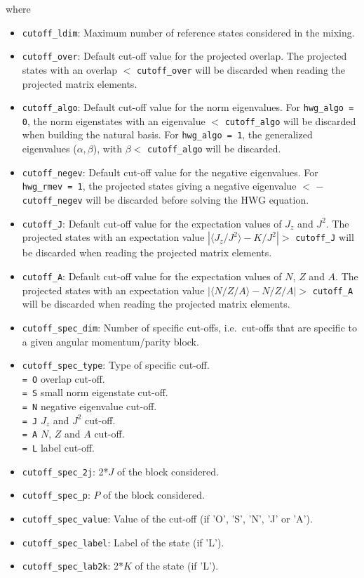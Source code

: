 \documentclass[a4paper,11pt]{article}
\newcommand{\ttt}[1]{\texttt{#1}}
\begin{document}
where
\begin{itemize}
\item \ttt{cutoff\_ldim}: Maximum number of reference states considered in the mixing.
\item \ttt{cutoff\_over}: Default cut-off value for the projected overlap. The projected states with an overlap $<$ \ttt{cutoff\_over} will be discarded when reading the projected matrix elements.
\item \ttt{cutoff\_algo}: Default cut-off value for the norm eigenvalues. For \ttt{hwg\_algo = 0}, the norm eigenstates with an eigenvalue $<$ \ttt{cutoff\_algo} will be discarded when 
      building the natural basis. For \ttt{hwg\_algo = 1}, the generalized eigenvalues ($\alpha,\beta$), with $\beta <$ \ttt{cutoff\_algo} will be discarded.
\item \ttt{cutoff\_negev}: Default cut-off value for the negative eigenvalues. For \ttt{hwg\_rmev = 1}, the projected states giving a negative eigenvalue $<$ $-$\ttt{cutoff\_negev} 
      will be discarded before solving the HWG equation.
\item \ttt{cutoff\_J}: Default cut-off value for the expectation values of $J_z$ and $J^2$. The projected states with an expectation value $|\langle J_z/J^2 \rangle - K/J^2| >$ \ttt{cutoff\_J}
      will be discarded when reading the projected matrix elements.
\item \ttt{cutoff\_A}: Default cut-off value for the expectation values of $N$, $Z$ and $A$. The projected states with an expectation value $|\langle N/Z/A \rangle - N/Z/A| >$ \ttt{cutoff\_A}
      will be discarded when reading the projected matrix elements.
\item \ttt{cutoff\_spec\_dim}: Number of specific cut-offs, i.e.\ cut-offs that are specific to a given angular momentum/parity block.
\item \ttt{cutoff\_spec\_type}: Type of specific cut-off. \\[0.05cm]
 \ttt{= O\:} overlap cut-off. \\[0.05cm]
 \ttt{= S\:} small norm eigenstate cut-off. \\[0.05cm]
 \ttt{= N\:} negative eigenvalue cut-off. \\[0.05cm]
 \ttt{= J\:} $J_z$ and $J^2$ cut-off. \\[0.05cm]
 \ttt{= A\:} $N$, $Z$ and $A$ cut-off. \\[0.05cm]
 \ttt{= L\:} label cut-off. 
\item \ttt{cutoff\_spec\_2j}: 2*$J$ of the block considered.
\item \ttt{cutoff\_spec\_p}: $P$ of the block considered.
\item \ttt{cutoff\_spec\_value}: Value of the cut-off (if 'O', 'S', 'N', 'J' or 'A').
\item \ttt{cutoff\_spec\_label}: Label of the state (if 'L').
\item \ttt{cutoff\_spec\_lab2k}: 2*$K$ of the state (if 'L').
\end{itemize}
\end{document}

